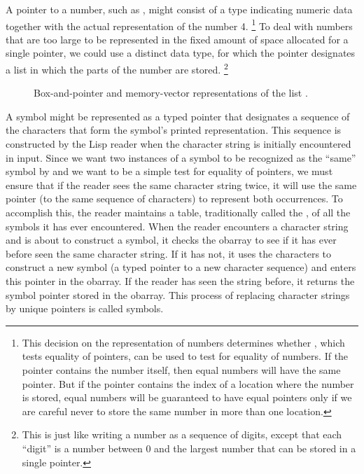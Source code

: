 A pointer to a number, such as , might consist of a type indicating numeric data together with the actual representation of the number 4.%
\footnote{
	This decision on the representation of numbers determines whether , which tests equality of pointers, can be used to test for equality of numbers.
	If the pointer contains the number itself, then equal numbers will have the same pointer.
	But if the pointer contains the index of a location where the number is stored, equal numbers will be guaranteed to have equal pointers only if we are careful never to store the same number in more than one location.
}
	To deal with numbers that are too large to be represented in the fixed amount of space allocated for a single pointer, we could use a distinct  data type, for which the pointer designates a list in which the parts of the number are stored.%
\footnote{
	This is just like writing a number as a sequence of digits, except that each “digit” is a number between \( 0 \) and the largest number that can be stored in a single pointer.
}

\begin{figure}[tb]
	\centering
	
	\caption{
		Box-and-pointer and memory-vector representations of the list .
	}
	\label{Figure 5.14}
\end{figure}

A symbol might be represented as a typed pointer that designates a sequence of the characters that form the symbol’s printed representation.
This sequence is constructed by the Lisp reader when the character string is initially encountered in input.
Since we want two instances of a symbol to be recognized as the “same” symbol by  and we want  to be a simple test for equality of pointers, we must ensure that if the reader sees the same character string twice, it will use the same pointer (to the same sequence of characters) to represent both occurrences.
To accomplish this, the reader maintains a table, traditionally called the , of all the symbols it has ever encountered.
When the reader encounters a character string and is about to construct a symbol, it checks the obarray to see if it has ever before seen the same character string.
If it has not, it uses the characters to construct a new symbol (a typed pointer to a new character sequence) and enters this pointer in the obarray.
If the reader has seen the string before, it returns the symbol pointer stored in the obarray.
This process of replacing character strings by unique pointers is called  symbols.



